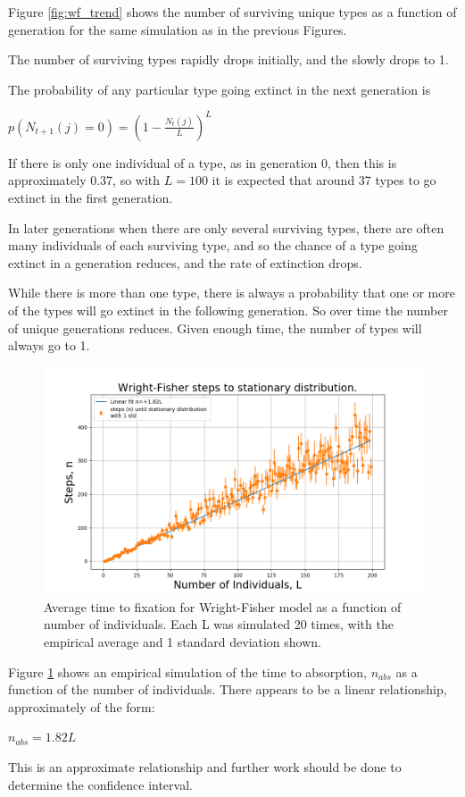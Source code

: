 \documentclass{article}
\begin{document}
Figure \ref{fig:wf_trend} shows the number of surviving unique types as a function of generation for the same simulation as in the previous Figures. 

The number of surviving types rapidly drops initially, and the  slowly drops to 1.

The probability of any particular type going extinct in the next generation is

$p(N_{t+1}(j) = 0) = (1-\frac{N_t(j)}{L})^{L}$

If there is only one individual of a type, as in generation 0, then this is approximately 0.37, so with $L=100$ it is expected that around 37 types to go extinct in the first generation. 

In later generations when there are only several surviving types, there are often many individuals of each surviving type, and so the chance of a type going extinct in a generation reduces, and the rate of extinction drops.

While there is more than one type, there is always a probability that one or more of the types will go extinct in the following generation. So over time the number of unique generations reduces. Given enough time, the number of types will always go to 1. 


\begin{figure}[H]
\includegraphics[scale=0.5]{Wright_Fisher_fixation_a.png} 
\caption{Average time to fixation for Wright-Fisher model as a function of number of individuals. Each L was simulated 20 times, with the empirical average and 1 standard deviation shown.}
\label{fig:wf_fixation}
\end{figure}

Figure \ref{fig:wf_fixation} shows an empirical simulation of the time to absorption, $n_{abs}$ as a function of the number of individuals. There appears to be a linear relationship, approximately of the form:

$n_{abs} = 1.82L $

This is an approximate relationship and further work should be done to determine the confidence interval.
\end{document}
